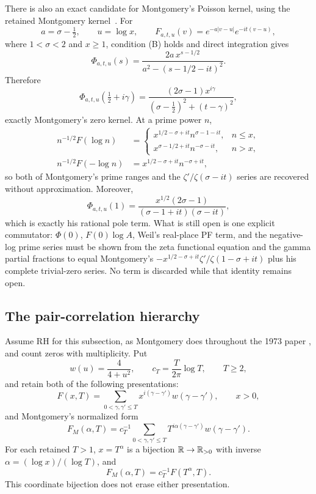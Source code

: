 There is also an exact candidate for Montgomery's Poisson kernel, using the retained
Montgomery kernel~\cite[pp.~185--187, eqs.~(18)--(22)]{montgomery1973}.  For
\[
 a=\sigma-\tfrac12,\qquad u=\log x,\qquad
 F_{a,t,u}(v)=e^{-a|v-u|}e^{-it(v-u)},
\]
where $1<\sigma<2$ and $x\geq1$, condition (B) holds and direct integration gives
\begin{equation}
 \Phi_{a,t,u}(s)=
 \frac{2a\,x^{s-1/2}}{a^2-(s-1/2-it)^2}.
 \label{eq:montgomery-weil-test}
\end{equation}
Therefore
\begin{equation}
 \Phi_{a,t,u}(\tfrac12+i\gamma)=
 \frac{(2\sigma-1)x^{i\gamma}}
 { (\sigma-\tfrac12)^2+(t-\gamma)^2},
 \label{eq:montgomery-weil-zero-kernel}
\end{equation}
exactly Montgomery's zero kernel.  At a prime power $n$,
\begin{align*}
 n^{-1/2}F(\log n)&=
 \begin{cases}
 x^{1/2-\sigma+it}n^{\sigma-1-it},&n\leq x,\\
 x^{\sigma-1/2+it}n^{-\sigma-it},&n>x,
 \end{cases}\\
 n^{-1/2}F(-\log n)&=x^{1/2-\sigma+it}n^{-\sigma+it},
\end{align*}
so both of Montgomery's prime ranges and the $\zeta'/\zeta(\sigma-it)$ series are recovered
without approximation.  Moreover,
\[
 \Phi_{a,t,u}(1)=
 \frac{x^{1/2}(2\sigma-1)}{(\sigma-1+it)(\sigma-it)},
\]
which is exactly his rational pole term.  What is still open is one explicit commutator:
$\Phi(0)$, $F(0)\log A$, Weil's real-place PF term, and the negative-log prime series must be
shown from the zeta functional equation and the gamma partial fractions to equal
Montgomery's $-x^{1/2-\sigma+it}\zeta'/\zeta(1-\sigma+it)$ plus his complete trivial-zero
series.  No term is discarded while that identity remains open.

\subsection{The pair-correlation hierarchy}

Assume RH for this subsection, as Montgomery does throughout the 1973 paper
\cite[pp.~181--192]{montgomery1973}, and count
zeros with multiplicity.  Put
\begin{equation}
 w(u)=\frac4{4+u^2},
 \qquad
 c_T=\frac{T}{2\pi}\log T,
 \qquad T\geq2,
 \label{eq:montgomery-weight-normalization}
\end{equation}
and retain both of the following presentations:
\begin{equation}
 F(x,T)=\sum_{0<\gamma,\gamma'\leq T}
 x^{i(\gamma-\gamma')}w(\gamma-\gamma'),
 \qquad x>0,
 \label{eq:F-xT}
\end{equation}
and Montgomery's normalized form
\begin{equation}
 F_M(\alpha,T)=c_T^{-1}
 \sum_{0<\gamma,\gamma'\leq T}
 T^{i\alpha(\gamma-\gamma')}w(\gamma-\gamma').
 \label{eq:F-alphaT}
\end{equation}
For each retained $T>1$, $x=T^\alpha$ is a bijection
$\mathbb R\to\mathbb R_{>0}$ with inverse $\alpha=(\log x)/(\log T)$, and
\[
 F_M(\alpha,T)=c_T^{-1}F(T^\alpha,T).
\]
This coordinate bijection does not erase either presentation.

